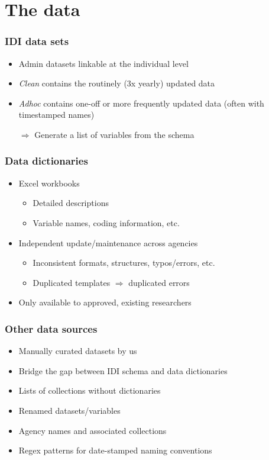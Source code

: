 \documentclass{beamer}
\begin{document}
\section{The data}

\begin{frame}
    \frametitle{IDI data sets}

    \begin{itemize}
        \item Admin datasets linkable at the individual level
        \item \emph{Clean} contains the routinely (3x yearly) updated data
        \item \emph{Adhoc} contains one-off or more frequently updated data (often with timestamped names)\\[2em]
        \item[$\Rightarrow$] Generate a list of variables from the schema
    \end{itemize}

\end{frame}

\begin{frame}
    \frametitle{Data dictionaries}

    \begin{itemize}
        \item Excel workbooks
        \begin{itemize}
            \item Detailed descriptions
            \item Variable names, coding information, etc.
        \end{itemize}
        \item Independent update/maintenance across agencies
        \begin{itemize}
            \item Inconsistent formats, structures, typos/errors, etc.
            \item Duplicated templates $\Rightarrow$ duplicated errors
        \end{itemize}
        \item Only available to approved, existing researchers
    \end{itemize}

\end{frame}


\begin{frame}
    \frametitle{Other data sources}

    \begin{itemize}
        \item Manually curated datasets by us
        \item Bridge the gap between IDI schema and data dictionaries\\[2em]
        \item Lists of collections without dictionaries
        \item Renamed datasets/variables
        \item Agency names and associated collections
        \item Regex patterns for date-stamped naming conventions
    \end{itemize}
\end{frame}
\end{document}
